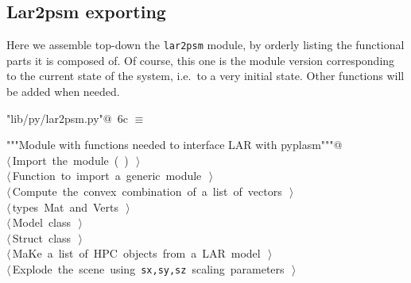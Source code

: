 \documentclass[11pt,oneside]{article}	%
\begin{document}
\subsection{Lar2psm exporting}
\label{sec:lar2psm}
Here we assemble top-down the \texttt{lar2psm} module, by orderly listing the functional parts it is composed of. Of course, this one is the module version corresponding to the current state of the system, i.e.~to a very initial state. Other functions will be added when needed.
\begin{flushleft} \small \label{scrap16}
\protect{}\verb@"lib/py/lar2psm.py"@\nobreak\ {\footnotesize 6c }$\equiv$
\vspace{-1ex}
\begin{list}{}{} \item
\mbox{}\verb@"""Module with functions needed to interface LAR with pyplasm"""@\\
\mbox{}\verb@@\hbox{$\langle\,$Import the module\nobreak\ ({\footnotesize {}\label{scrap17}
 }\mbox{}\verb@simplexn@ ) {\footnotesize {}}$\,\rangle$}\verb@@\\
\mbox{}\verb@@\hbox{$\langle\,$Function to import a generic module\nobreak\ {\footnotesize {}}$\,\rangle$}\verb@@\\
\mbox{}\verb@@\hbox{$\langle\,$Compute the convex combination of a list of vectors\nobreak\ {\footnotesize {}}$\,\rangle$}\verb@@\\
\mbox{}\verb@@\hbox{$\langle\,$types Mat and Verts\nobreak\ {\footnotesize {}}$\,\rangle$}\verb@@\\
\mbox{}\verb@@\hbox{$\langle\,$Model class\nobreak\ {\footnotesize {}}$\,\rangle$}\verb@@\\
\mbox{}\verb@@\hbox{$\langle\,$Struct class\nobreak\ {\footnotesize {}}$\,\rangle$}\verb@@\\
\mbox{}\verb@@\hbox{$\langle\,$MaKe a list of HPC objects from a LAR model\nobreak\ {\footnotesize {}}$\,\rangle$}\verb@@\\
\mbox{}\verb@@\hbox{$\langle\,$Explode the scene using \texttt{sx,sy,sz} scaling parameters\nobreak\ {\footnotesize {}}$\,\rangle$}\verb@@\\
\mbox{}\verb@@{\NWsep}
\end{list}
\vspace{-2ex}
\end{flushleft}
\end{document}
